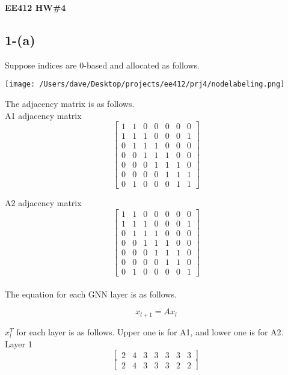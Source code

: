 \documentclass{article}
\begin{document}
\textbf{EE412 HW\#4}\\


\subsection*{1-(a)}

Suppose indices are 0-based and allocated as follows.\\

\begin{center}
    \texttt{[image: /Users/dave/Desktop/projects/ee412/prj4/nodelabeling.png]}    
\end{center}

The adjacency matrix is as follows.\\

A1 adjacency matrix
\[
\begin{bmatrix}
1 & 1 & 0 & 0 & 0 & 0 & 0 \\
1 & 1 & 1 & 0 & 0 & 0 & 1 \\
0 & 1 & 1 & 1 & 0 & 0 & 0 \\
0 & 0 & 1 & 1 & 1 & 0 & 0 \\
0 & 0 & 0 & 1 & 1 & 1 & 0 \\
0 & 0 & 0 & 0 & 1 & 1 & 1 \\
0 & 1 & 0 & 0 & 0 & 1 & 1
\end{bmatrix}
\]

A2 adjacency matrix
\[
\begin{bmatrix}
1 & 1 & 0 & 0 & 0 & 0 & 0 \\
1 & 1 & 1 & 0 & 0 & 0 & 1 \\
0 & 1 & 1 & 1 & 0 & 0 & 0 \\
0 & 0 & 1 & 1 & 1 & 0 & 0 \\
0 & 0 & 0 & 1 & 1 & 1 & 0 \\
0 & 0 & 0 & 0 & 1 & 1 & 0 \\
0 & 1 & 0 & 0 & 0 & 0 & 1
\end{bmatrix}
\]\\


The equation for each GNN layer is as follows.

\[
    x_{l+1} = Ax_l
\]

\(x_l^T\) for each layer is as follows. Upper one is for A1, and lower one is for A2.\\

Layer 1
\[
\begin{bmatrix}
2 & 4 & 3 & 3 & 3 & 3 & 3
\end{bmatrix}
\]
\[
\begin{bmatrix}
2 & 4 & 3 & 3 & 3 & 2 & 2
\end{bmatrix}
\]
\end{document}
